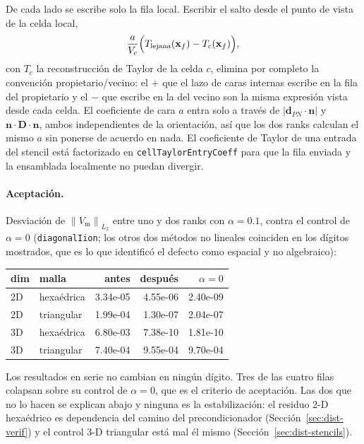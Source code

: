 \documentclass[11pt,a4paper]{article}
\newcommand{\code}[1]{\texttt{\small #1}}
\newcommand{\Vm}{V_{\text{m}}}
\newcommand{\Dten}{\mathbf{D}}
\newcommand{\norm}[1]{\left\lVert #1 \right\rVert}
\begin{document}
De cada lado se escribe solo la fila local. Escribir el salto desde el punto de
vista de la celda local,
\[
   \frac{a}{V_{c}}\Bigl( T_{\text{lejana}}(\mathbf{x}_{f})
                        - T_{c}(\mathbf{x}_{f}) \Bigr),
\]
con $T_{c}$ la reconstrucción de Taylor de la celda $c$, elimina por completo la
convención propietario/vecino: el $+$ que el lazo de caras internas escribe en
la fila del propietario y el $-$ que escribe en la del vecino son la misma
expresión vista desde cada celda. El coeficiente de cara $a$ entra solo a través
de $|\mathbf{d}_{PN}\!\cdot\!\mathbf{n}|$ y
$\mathbf{n}\!\cdot\!\Dten\!\cdot\!\mathbf{n}$, ambos independientes de la
orientación, así que los dos ranks calculan el mismo $a$ sin ponerse de acuerdo
en nada. El coeficiente de Taylor de una entrada del stencil está factorizado en
\code{cellTaylorEntryCoeff} para que la fila enviada y la ensamblada localmente
no puedan divergir.

\paragraph{Aceptación.} Desviación de $\norm{\Vm}_{L_2}$ entre uno y dos ranks
con $\alpha=0.1$, contra el control de $\alpha=0$ (\code{diagonalIion}; los
otros dos métodos no lineales coinciden en los dígitos mostrados, que es lo que
identificó el defecto como espacial y no algebraico):

\begin{center}
\begin{tabular}{@{}llrrr@{}}
\toprule
dim & malla & antes & después & $\alpha=0$ \\
\midrule
2D & hexaédrica & 3.34e-05 & 4.55e-06 & 2.40e-09 \\
2D & triangular & 1.99e-04 & 1.30e-07 & 2.04e-07 \\
3D & hexaédrica & 6.80e-03 & 7.38e-10 & 1.81e-10 \\
3D & triangular & 7.40e-04 & 9.55e-04 & 9.70e-04 \\
\bottomrule
\end{tabular}
\end{center}

Los resultados en serie no cambian en ningún dígito. Tres de las cuatro filas
colapsan sobre su control de $\alpha=0$, que es el criterio de aceptación. Las
dos que no lo hacen se explican abajo y ninguna es la estabilización: el residuo
2-D hexaédrico es dependencia del camino del precondicionador
(Sección~\ref{sec:dist-verif}) y el control 3-D triangular está mal él mismo
(Sección~\ref{sec:dist-stencils}).
\end{document}
